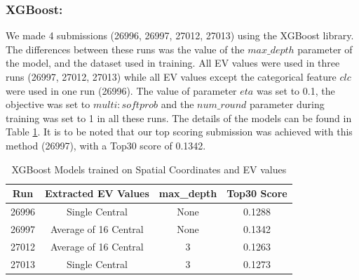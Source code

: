 \documentclass[runningheads]{llncs}
\begin{document}
\subsubsection{XGBoost:} We made 4 submissions (26996, 26997, 27012, 27013) using the XGBoost library. The differences between these runs was the value of the $max\_depth$ parameter of the model, and the dataset used in training. All EV values were used in three runs (26997, 27012, 27013) while all EV values except the categorical feature $clc$ were used in one run (26996). The value of parameter $eta$ was set to 0.1, the objective was set to $multi:softprob$ and the $num\_round$ parameter during training was set to 1 in all these runs. The details of the models can be found in Table \ref{table:xgbev}. It is to be noted that our top scoring submission was achieved with this method (26997), with a Top30 score of 0.1342.
\setlength{\tabcolsep}{6pt}
\begin{table}[]
    \centering
    \setlength{\abovecaptionskip}{25pt}
    \setlength{\belowcaptionskip}{-25pt}
    \begin{tabular}{| c | c | c | c |}
         \hline
         \textbf{ Run } & \textbf{ Extracted EV Values }  & \textbf{ max\_depth } & \textbf{ Top30 Score } \\
         \hline
         26996 & Single Central & None & 0.1288 \\
         \hline
         26997 & Average of 16 Central & None & 0.1342 \\
         \hline
         27012 & Average of 16 Central & 3 & 0.1263 \\
         \hline
         27013 & Single Central & 3 & 0.1273 \\
         \hline
    \end{tabular}
    \caption{XGBoost Models trained on Spatial Coordinates and EV values}
    \label{table:xgbev}
\end{table}
\end{document}
